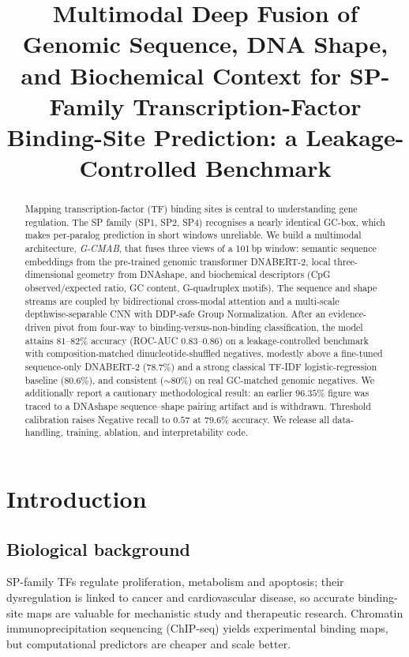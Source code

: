\documentclass[11pt]{article}
\title{\textbf{Multimodal Deep Fusion of Genomic Sequence, DNA Shape,\\
and Biochemical Context for SP-Family Transcription-Factor\\
Binding-Site Prediction: a Leakage-Controlled Benchmark}}
\author{}
\date{}
\begin{document}
\maketitle

\begin{abstract}
\noindent
Mapping transcription-factor (TF) binding sites is central to understanding gene
regulation. The SP family (SP1, SP2, SP4) recognises a nearly identical GC-box,
which makes per-paralog prediction in short windows unreliable. We build a
multimodal architecture, \emph{G-CMAB}, that fuses three views of a 101\,bp window:
semantic sequence embeddings from the pre-trained genomic transformer DNABERT-2,
local three-dimensional geometry from DNAshape, and biochemical descriptors
(CpG observed/expected ratio, GC content, G-quadruplex motifs). The sequence and
shape streams are coupled by bidirectional cross-modal attention and a multi-scale
depthwise-separable CNN with DDP-safe Group Normalization. After an evidence-driven
pivot from four-way to binding-versus-non-binding classification, the model attains
$81$--$82\%$ accuracy (ROC-AUC $0.83$--$0.86$) on a leakage-controlled benchmark
with composition-matched dinucleotide-shuffled negatives, modestly above a
fine-tuned sequence-only DNABERT-2 ($78.7\%$) and a strong classical TF-IDF
logistic-regression baseline ($80.6\%$), and consistent ($\sim\!80\%$) on real
GC-matched genomic negatives. We additionally report a cautionary methodological
result: an earlier $96.35\%$ figure was traced to a DNAshape sequence--shape
pairing artifact and is withdrawn. Threshold calibration raises Negative recall to
$0.57$ at $79.6\%$ accuracy. We release all data-handling, training, ablation, and
interpretability code.
\end{abstract}

\section{Introduction}

\subsection{Biological background}
SP-family TFs regulate proliferation, metabolism and apoptosis; their dysregulation
is linked to cancer and cardiovascular disease, so accurate binding-site maps are
valuable for mechanistic study and therapeutic research. Chromatin
immunoprecipitation sequencing (ChIP-seq) yields experimental binding maps, but
computational predictors are cheaper and scale better.
\end{document}
